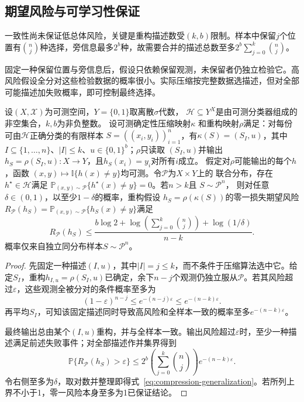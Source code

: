 \subsection{期望风险与可学习性保证}

一致性尚未保证低总体风险，关键是重构描述数受$(k,b)$限制。样本中保留$j$个位置有$\binom nj$种选择，旁信息最多$2^b$种，故需要合并的描述总数至多$2^b\sum_{j=0}^k\binom nj$。

固定一种保留位置与旁信息后，假设只依赖保留观测，未保留者仍独立检验它。高风险假设全分对这些检验数据的概率很小。实际压缩按完整数据选描述，但对全部可能描述加失败概率，即可控制最终选择。

\begin{theorem}[一致样本压缩的期望风险上界]
\label{thm:sample-compression-bound}
设$(X,\mathcal X)$为可测空间，$Y=\{0,1\}$取离散$\sigma$代数，
$\mathcal H\subseteq Y^X$是由可测分类器组成的非空集合，$k,b$为非负整数。
设可测确定性压缩映射$\kappa$
和重构映射$\rho$满足：对每份可由$\mathcal H$正确分类的有限样本
$S=((x_i,y_i))_{i=1}^n$，有$\kappa(S)=(S_I,u)$，其中
$I\subseteq\{1,\ldots,n\}$、$|I|\leq k$、$u\in\{0,1\}^b$；$\rho$只读取
$(S_I,u)$并输出$h_S=\rho(S_I,u):X\to Y$，且$h_S(x_i)=y_i$对所有$i$成立。
假定对$\rho$可能输出的每个$h$，函数
$(x,y)\mapsto\mathbb I\{h(x)\neq y\}$均可测。令$\mathcal P$为$X\times Y$上的
联合分布，存在$h^\star\in\mathcal H$满足
$\mathbb P_{(x,y)\sim\mathcal P}\{h^\star(x)\neq y\}=0$。若$n>k$且
$S\sim\mathcal P^n$，
则对任意$\delta\in(0,1)$，以至少$1-\delta$的概率，重构假设
$h_S=\rho(\kappa(S))$的零一损失期望风险
$R_{\mathcal P}(h_S)=\mathbb P_{(x,y)\sim\mathcal P}\{h_S(x)\neq y\}$满足
\begin{equation}
 R_{\mathcal P}(h_S)
 \leq\frac{b\log2+\log\!\left(\sum_{j=0}^k\binom nj\right)+\log(1/\delta)}{n-k}.
 \label{eq:compression-generalization}
\end{equation}
概率仅来自独立同分布样本$S\sim\mathcal P^n$。
\end{theorem}

\begin{proof}
先固定一种描述$(I,u)$，其中$|I|=j\leq k$，而不条件于压缩算法选中它。给定$S_I$，重构$h_{I,u}=\rho(S_I,u)$已确定，余下$n-j$个观测仍独立服从$\mathcal P$。若其风险超过$\varepsilon$，这些观测全被分对的条件概率至多为
\[
 (1-\varepsilon)^{n-j}\leq e^{-(n-j)\varepsilon}
 \leq e^{-(n-k)\varepsilon}.
\]
再平均$S_I$，可知该固定描述同时导致高风险和全样本一致的概率至多$e^{-(n-k)\varepsilon}$。

最终输出总由某个$(I,u)$重构，并与全样本一致。输出风险超过$\varepsilon$时，至少一种描述满足前述失败事件；对全部描述作并集界得到
\[
 \mathbb P\{R_{\mathcal P}(h_S)>\varepsilon\}
 \leq 2^b\left(\sum_{j=0}^k\binom nj\right)e^{-(n-k)\varepsilon}.
\]
令右侧至多为$\delta$，取对数并整理即得式~\eqref{eq:compression-generalization}。若所列上界不小于1，零一风险本身至多为1已保证结论。
\end{proof}

